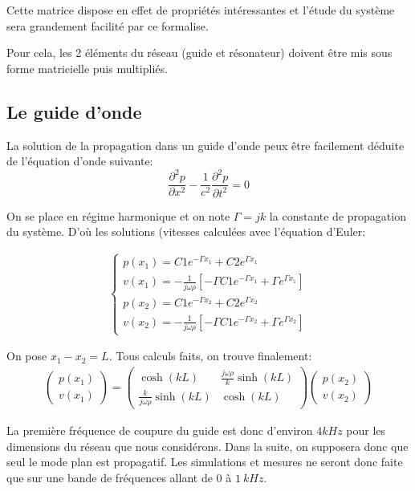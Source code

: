 Cette matrice dispose en effet de propriétés intéressantes et l'étude du système sera grandement facilité par ce formalise.

Pour cela, les 2 éléments du réseau (guide et résonateur) doivent être mis sous forme matricielle puis multipliés.

\subsection{Le guide d'onde}
La solution de la propagation dans un guide d'onde peux être facilement déduite de l'équation d'onde suivante:
\begin{equation}
\frac{\partial ^2 p}{\partial x^2} -\frac{1}{c^{2}} \frac{\partial ^2 p}{\partial t^2}= 0
\end{equation}

On se place en régime harmonique et on note $\Gamma = jk$ la constante de propagation du système. D’où les solutions (vitesses calculées avec l'équation d'Euler:

\begin{eqnarray*}
\begin{cases}
p(x_1)  =  C1 e^{-\Gamma x_1} + C2 e^{\Gamma x_1} \\
v(x_1)  =  -\frac{1}{j\omega\rho} [ -\Gamma C1 e^{-\Gamma x_1} + \Gamma e^{\Gamma x_1}]\\
p(x_2)  =  C1 e^{-\Gamma x_2} + C2 e^{\Gamma x_2} \\
v(x_2)  =  -\frac{1}{j\omega\rho} [ -\Gamma C1 e^{-\Gamma x_2} + \Gamma e^{\Gamma x_2}]
\end{cases}
\end{eqnarray*}
 
On pose $x_1 - x_2 = L$. Tous calculs faits, on trouve finalement:
\begin{eqnarray*}
\begin{pmatrix} p(x_1) \\ v(x_1) \end{pmatrix} = \begin{pmatrix} \cosh(kL) & \frac{j\omega\rho}{k} \sinh(k L) \\  \frac{k}{j\omega\rho}\sinh(k L) & \cosh(k L) \end{pmatrix} \begin{pmatrix} p(x_2) \\ v(x_2) \end{pmatrix}
\end{eqnarray*}

La première fréquence de coupure du guide est donc d'environ $4kHz$ pour les dimensions du réseau que nous considérons. Dans la suite, on supposera donc que seul le mode plan est propagatif. Les simulations et mesures ne seront donc faite que sur une bande de fréquences allant de $0$ à $1~kHz$.

